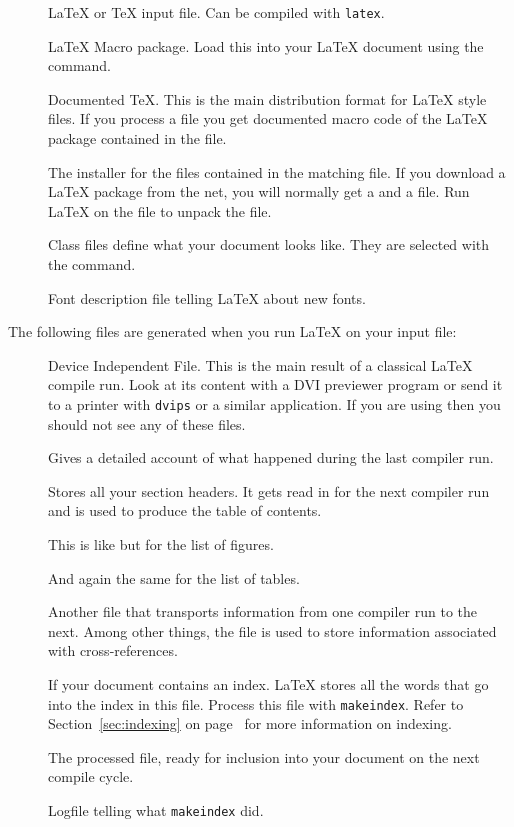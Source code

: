 \begin{description}

  \item[] \LaTeX{} or \TeX{} input file. Can be compiled with
    \texttt{latex}.
  \item[] \LaTeX{} Macro package. Load this
    into your \LaTeX{} document using the  command.
  \item[] Documented \TeX{}. This is the main distribution
    format for \LaTeX{} style files. If you process a  file you get
    documented macro code of the \LaTeX{} package contained in the 
    file.
  \item[] The installer for the files contained in the
    matching  file. If you download a \LaTeX{} package from the net,
    you will normally get a  and a  file. Run \LaTeX{} on the
     file to unpack the  file.
  \item[] Class files define what your document looks
    like. They are selected with the  command.
  \item[] Font description file telling  \LaTeX{} about new fonts.
\end{description}
The following files are generated when you run \LaTeX{} on your input
file:

\begin{description}
  \item[] Device Independent File. This is the main result of a classical \LaTeX{}
    compile run. Look at its content with a DVI previewer
    program or send it to a printer with \texttt{dvips} or a
    similar application. If you are using  then you should not see any of these files.
  \item[] Gives a detailed account of what happened during the
    last compiler run.
  \item[] Stores all your section headers. It gets read in for the
    next compiler run and is used to produce the table of contents.
  \item[] This is like  but for the list of figures.
  \item[] And again the same for the list of tables.
  \item[] Another file that transports information from one
    compiler run to the next. Among other things, the  file is used
    to store information associated with cross-references.
  \item[] If your document contains an index. \LaTeX{} stores all
    the words that go into the index in this file. Process this file with
    \texttt{makeindex}. Refer to Section~\ref{sec:indexing} on
    page~\pageref{sec:indexing} for more information on indexing.
  \item[] The processed  file, ready for inclusion into your
    document on the next compile cycle.
  \item[] Logfile telling what \texttt{makeindex} did.
\end{description}


